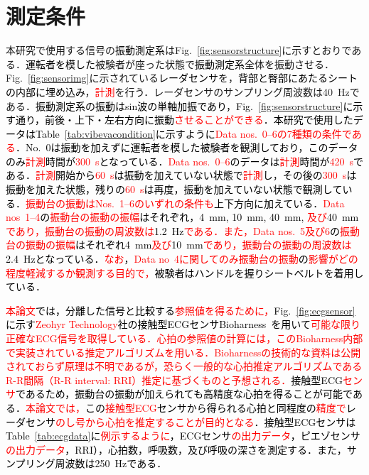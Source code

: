 \section{測定条件}
\label{sec:conv:measurementcondition}
		本研究で使用する信号の\textcolor{black}{振動測定系}はFig.~\ref{fig:sensorstructure}に示すとおりである．\textcolor{black}{運転者を模した}被験者が座った状態で\textcolor{black}{振動測定系}全体を振動させる．Fig.~\ref{fig:sensorimg}に示されている\textcolor{black}{レーダセンサ}を，\textcolor{black}{背部と臀部にあたるシートの内部に埋め込み}，\textcolor{red}{計測}を行う．レーダセンサのサンプリング周波数は40~Hzである．\textcolor{black}{振動測定系の振動はsin波の単軸加振であり，Fig.~\ref{fig:sensorstructure}に示す通り，前後・上下・左右方向に振動\textcolor{red}{させることができる}．本研究で使用したデータはTable~\ref{tab:vibevacondition}に示すように\textcolor{red}{Data nos.~0--6の7種類の条件である}．No.~0は振動を加えずに運転者を模した被験者を観測しており，このデータのみ\textcolor{red}{計測}時間が\textcolor{red}{300~s}となっている．\textcolor{red}{Data nos.~0--6}のデータは\textcolor{red}{計測}時間が\textcolor{red}{420~s}である．\textcolor{red}{計測}開始から\textcolor{red}{60~s}は振動を加えていない状態で\textcolor{red}{計測}し，その後の\textcolor{red}{300~s}は振動を加えた状態，残りの\textcolor{red}{60~s}は再度，振動を加えていない状態で観測している．\textcolor{red}{振動台の振動はNos.~1--6のいずれの条件も}上下方向に加えている．\textcolor{red}{Data nos~1--4}の\textcolor{red}{振動台の振動の振幅}はそれぞれ，4~mm, 10~mm, 40~mm, \textcolor{red}{及び}40~mm\textcolor{red}{であり，振動台の振動の周波数は}1.2~Hz\textcolor{red}{である．また，Data nos.~5及び6}の\textcolor{red}{振動台の振動の振幅}はそれぞれ4~mm\textcolor{red}{及び}10~mm\textcolor{red}{であり，振動台の振動の周波数は}2.4~Hzとなっている．\textcolor{red}{なお}，\textcolor{red}{Data no~4に関してのみ振動台の振動}の\textcolor{red}{影響がどの程度軽減するか観測する目的で，}被験者はハンドルを握りシートベルトを着用している．}

\textcolor{black}{\textcolor{red}{本論文}では，分離した信号と比較する\textcolor{red}{参照値を得るために，}Fig.~\ref{fig:ecgsensor}に示す\textcolor{red}{Zeohyr Technology}社の接触型ECGセンサBioharness~\cite{bioharness}を用いて\textcolor{red}{可能な限り正確なECG信号を取得している．心拍の参照値の計算には，このBioharness内部で実装されている推定アルゴリズムを用いる．Bioharnessの技術的な資料は公開されておらず原理は不明であるが，恐らく一般的な心拍推定アルゴリズムであるR-R間隔（R-R interval: RRI）推定に基づくものと予想される．}接触型ECG\textcolor{red}{センサ}であるため，振動台の振動が加えられても高精度な心拍を得ることが可能である．\textcolor{red}{本論文では，}この\textcolor{red}{接触型ECG}センサから得られる心拍と同程度の\textcolor{red}{精度で}レーダセンサ\textcolor{red}{のし号から心拍を推定することが目的となる}．接触型ECGセンサはTable~\ref{tab:ecgdata}に\textcolor{red}{例示するように}，ECGセンサ\textcolor{red}{の出力データ}，ピエゾセンサ\textcolor{red}{の出力データ}，RRI），心拍数，呼吸数，及び呼吸の深さを測定する．また，サンプリング周波数は250~Hzである．}


